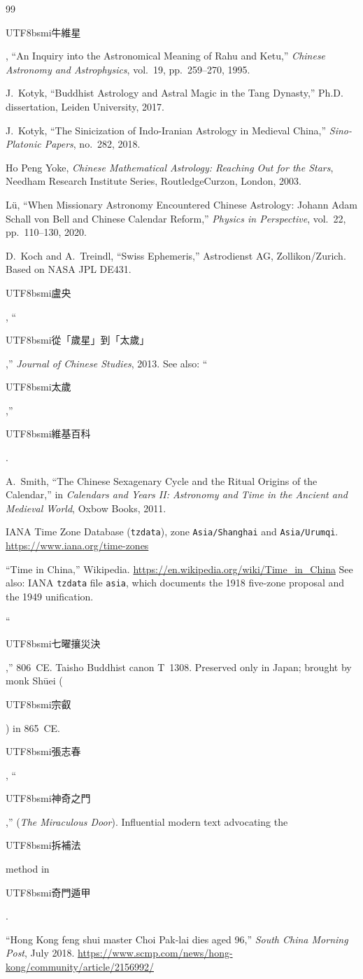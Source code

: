 \documentclass[10pt,a4paper]{article}
\newcommand{\zh}[1]{\begin{CJK}{UTF8}{bsmi}#1\end{CJK}}
\begin{document}
\begin{sloppypar}
\begin{thebibliography}{99}
\zh{牛維星}, ``An Inquiry into the Astronomical Meaning of Rahu and Ketu,''
\textit{Chinese Astronomy and Astrophysics}, vol.~19, pp.~259--270, 1995.

J.~Kotyk, ``Buddhist Astrology and Astral Magic in the Tang Dynasty,''
Ph.D. dissertation, Leiden University, 2017.

J.~Kotyk, ``The Sinicization of Indo-Iranian Astrology in Medieval China,''
\textit{Sino-Platonic Papers}, no.~282, 2018.

Ho Peng Yoke, \textit{Chinese Mathematical Astrology: Reaching Out for the
Stars}, Needham Research Institute Series, RoutledgeCurzon, London, 2003.

L\"u, ``When Missionary Astronomy Encountered Chinese Astrology: Johann Adam
Schall von Bell and Chinese Calendar Reform,'' \textit{Physics in
Perspective}, vol.~22, pp.~110--130, 2020.

D.~Koch and A.~Treindl, ``Swiss Ephemeris,'' Astrodienst AG,
Zollikon/Zurich. Based on NASA JPL DE431.

\zh{盧央}, ``\zh{從「歲星」到「太歲」},''
\textit{Journal of Chinese Studies}, 2013.
See also: ``\zh{太歲},'' \zh{維基百科}.

A.~Smith, ``The Chinese Sexagenary Cycle and the Ritual Origins of the
Calendar,'' in \textit{Calendars and Years II: Astronomy and Time in the
Ancient and Medieval World}, Oxbow Books, 2011.

IANA Time Zone Database (\texttt{tzdata}), zone \texttt{Asia/Shanghai}
and \texttt{Asia/Urumqi}.
\url{https://www.iana.org/time-zones}

``Time in China,'' Wikipedia.
\url{https://en.wikipedia.org/wiki/Time_in_China}
See also: IANA \texttt{tzdata} file \texttt{asia}, which documents the
1918 five-zone proposal and the 1949 unification.

``\zh{七曜攘災決},'' 806~CE. Taisho Buddhist canon T~1308. Preserved only
in Japan; brought by monk Sh\=uei (\zh{宗叡}) in 865~CE.

\zh{張志春}, ``\zh{神奇之門},'' (\textit{The Miraculous Door}).
Influential modern text advocating the \zh{拆補法} method in
\zh{奇門遁甲}.

``Hong Kong feng shui master Choi Pak-lai dies aged 96,''
\textit{South China Morning Post}, July 2018.
\url{https://www.scmp.com/news/hong-kong/community/article/2156992/}


\end{thebibliography}
\end{sloppypar}
\end{document}
